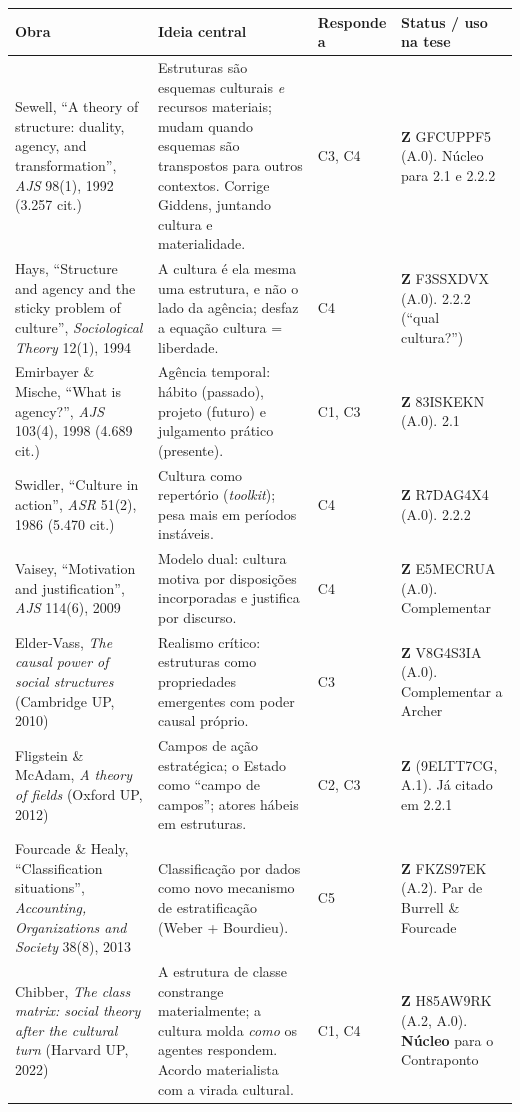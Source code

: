 \documentclass[10pt]{article}
\begin{document}
\footnotesize
\renewcommand{\arraystretch}{1.25}
\begin{tabularx}{\textwidth}{@{}>{\raggedright\arraybackslash}p{5.3cm} >{\raggedright\arraybackslash}X >{\raggedright\arraybackslash}p{2.2cm} >{\raggedright\arraybackslash}p{3.6cm}@{}}
\toprule
\textbf{Obra} & \textbf{Ideia central} & \textbf{Responde a} & \textbf{Status / uso na tese} \\
\midrule
Sewell, ``A theory of structure: duality, agency, and transformation'', \emph{AJS} 98(1), 1992 (3.257 cit.) & Estruturas são esquemas culturais \emph{e} recursos materiais; mudam quando esquemas são transpostos para outros contextos. Corrige Giddens, juntando cultura e materialidade. & C3, C4 & \textbf{Z} GFCUPPF5 (A.0). Núcleo para 2.1 e 2.2.2 \\
Hays, ``Structure and agency and the sticky problem of culture'', \emph{Sociological Theory} 12(1), 1994 & A cultura é ela mesma uma estrutura, e não o lado da agência; desfaz a equação cultura = liberdade. & C4 & \textbf{Z} F3SSXDVX (A.0). 2.2.2 (``qual cultura?'') \\
Emirbayer \& Mische, ``What is agency?'', \emph{AJS} 103(4), 1998 (4.689 cit.) & Agência temporal: hábito (passado), projeto (futuro) e julgamento prático (presente). & C1, C3 & \textbf{Z} 83ISKEKN (A.0). 2.1 \\
Swidler, ``Culture in action'', \emph{ASR} 51(2), 1986 (5.470 cit.) & Cultura como repertório (\emph{toolkit}); pesa mais em períodos instáveis. & C4 & \textbf{Z} R7DAG4X4 (A.0). 2.2.2 \\
Vaisey, ``Motivation and justification'', \emph{AJS} 114(6), 2009 & Modelo dual: cultura motiva por disposições incorporadas e justifica por discurso. & C4 & \textbf{Z} E5MECRUA (A.0). Complementar \\
Elder-Vass, \emph{The causal power of social structures} (Cambridge UP, 2010) & Realismo crítico: estruturas como propriedades emergentes com poder causal próprio. & C3 & \textbf{Z} V8G4S3IA (A.0). Complementar a Archer \\
Fligstein \& McAdam, \emph{A theory of fields} (Oxford UP, 2012) & Campos de ação estratégica; o Estado como ``campo de campos''; atores hábeis em estruturas. & C2, C3 & \textbf{Z} (9ELTT7CG, A.1). Já citado em 2.2.1 \\
Fourcade \& Healy, ``Classification situations'', \emph{Accounting, Organizations and Society} 38(8), 2013 & Classificação por dados como novo mecanismo de estratificação (Weber + Bourdieu). & C5 & \textbf{Z} FKZS97EK (A.2). Par de Burrell \& Fourcade \\
Chibber, \emph{The class matrix: social theory after the cultural turn} (Harvard UP, 2022) & A estrutura de classe constrange materialmente; a cultura molda \emph{como} os agentes respondem. Acordo materialista com a virada cultural. & C1, C4 & \textbf{Z} H85AW9RK (A.2, A.0). \textbf{Núcleo} para o Contraponto \\
\bottomrule
\end{tabularx}
\end{document}
